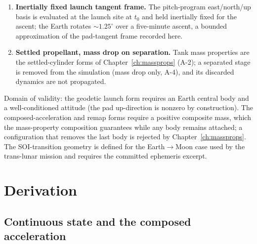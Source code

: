 \begin{enumerate}
    flight-path angle uses the \emph{inertial} velocity,
    $\gamma = \arcsin\!\bigl((\vv{r}\cdot\vv{v})/(r\,v)\bigr)$, the standard
    trajectory diagnostic; the two conventions are stated here and applied
    consistently by \texttt{run\_vehicle}.
  \item \textbf{Inertially fixed launch tangent frame.} The pitch-program
    east/north/up basis is evaluated at the launch site at $t_0$ and held
    inertially fixed for the ascent; the Earth rotates $\sim\!1.25^{\circ}$
    over a five-minute ascent, a bounded approximation of the pad-tangent
    frame recorded here.
  \item \textbf{Settled propellant, mass drop on separation.} Tank mass
    properties are the settled-cylinder forms of Chapter~\ref{ch:massprops}
    (A-2); a separated stage is removed from the simulation (mass drop only,
    A-4), and its discarded dynamics are not propagated.
\end{enumerate}

Domain of validity: the geodetic launch form requires an Earth central body
and a well-conditioned attitude (the pad up-direction is nonzero by
construction). The composed-acceleration and remap forms require a positive
composite mass, which the mass-property composition guarantees while any body
remains attached; a configuration that removes the last body is rejected by
Chapter~\ref{ch:massprops}. The SOI-transition geometry is defined for the
Earth$\to$Moon case used by the trans-lunar mission and requires the
committed ephemeris excerpt.

\section{Derivation}
\label{sec:vehicle6dof:derivation}

\subsection{Continuous state and the composed acceleration}

